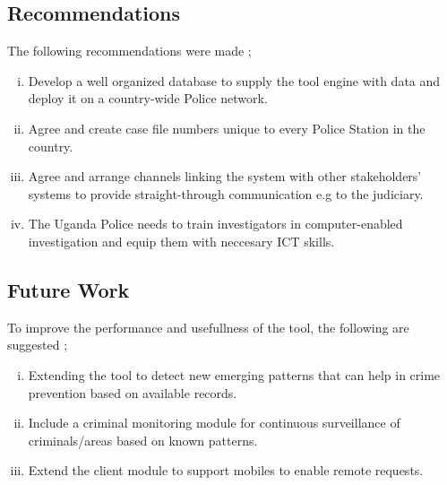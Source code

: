 \subsection{Recommendations}

\noindent The following recommendations were made ;

\begin{enumerate}[(i)]
\item Develop a well organized database to supply the tool engine with data and deploy it on a  country-wide Police network.
\item Agree and create case file numbers unique to every Police Station in the country.
\item Agree and arrange channels linking the system with other stakeholders' systems to provide straight-through communication e.g to the judiciary.
\item The Uganda Police needs to train investigators in computer-enabled investigation and equip them with neccesary ICT skills.
\end{enumerate}

\subsection{Future Work}

\noindent To improve the performance and usefullness of the tool, the following are suggested ;

\begin{enumerate}[(i)]
\item Extending the tool to detect new emerging patterns that can help in crime prevention based on available records.
\item Include a criminal monitoring module for continuous surveillance of criminals/areas based on known patterns.
\item Extend the client module to support mobiles to enable remote requests.

\end{enumerate}
